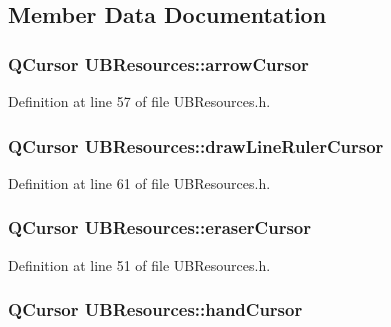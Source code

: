 \subsection{Member Data Documentation}
\hypertarget{class_u_b_resources_abf16c4c391a562aed1b995c44e263624}{
\subsubsection[{arrow\-Cursor}]{\setlength{\rightskip}{0pt plus 5cm}Q\-Cursor U\-B\-Resources\-::arrow\-Cursor}}\label{d8/d23/class_u_b_resources_abf16c4c391a562aed1b995c44e263624}


Definition at line 57 of file U\-B\-Resources.\-h.

\hypertarget{class_u_b_resources_a9e69d6645d67e7a42e6dcc5773470740}{
\subsubsection[{draw\-Line\-Ruler\-Cursor}]{\setlength{\rightskip}{0pt plus 5cm}Q\-Cursor U\-B\-Resources\-::draw\-Line\-Ruler\-Cursor}}\label{d8/d23/class_u_b_resources_a9e69d6645d67e7a42e6dcc5773470740}


Definition at line 61 of file U\-B\-Resources.\-h.

\hypertarget{class_u_b_resources_a84824b970a369ad44df93b32b5c4c296}{
\subsubsection[{eraser\-Cursor}]{\setlength{\rightskip}{0pt plus 5cm}Q\-Cursor U\-B\-Resources\-::eraser\-Cursor}}\label{d8/d23/class_u_b_resources_a84824b970a369ad44df93b32b5c4c296}


Definition at line 51 of file U\-B\-Resources.\-h.

\hypertarget{class_u_b_resources_af9aebbfa5288b8428b4684cb38e7b85c}{
\subsubsection[{hand\-Cursor}]{\setlength{\rightskip}{0pt plus 5cm}Q\-Cursor U\-B\-Resources\-::hand\-Cursor}}\label{d8/d23/class_u_b_resources_af9aebbfa5288b8428b4684cb38e7b85c}


